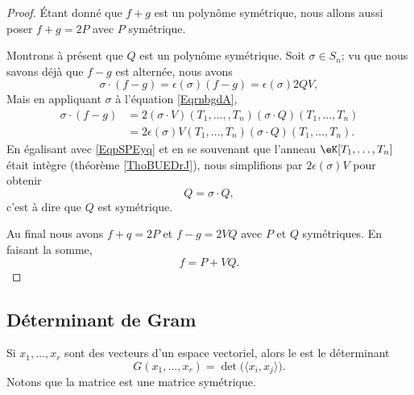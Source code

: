 \begin{proof}
    Étant donné que \( f+g\) est un polynôme symétrique, nous allons aussi poser \( f+g=2P\) avec \( P\) symétrique.

    Montrons à présent que \( Q\) est un polynôme symétrique. Soit \( \sigma\in S_n\); vu que nous savons déjà que \( f-g\) est alternée, nous avons
    \begin{equation}    \label{EqpSPEyq}
        \sigma\cdot (f-g)=\epsilon(\sigma)(f-g)=\epsilon(\sigma)2QV,
    \end{equation}
    Mais en appliquant \( \sigma\) à l'équation \eqref{EqrnbgdA},
    \begin{subequations}
        \begin{align}
            \sigma\cdot (f-g)&=2(\sigma\cdot V)(T_1,\ldots, ,T_n)(\sigma\cdot Q)(T_1,\ldots,T_n)\\
            &=2\epsilon(\sigma)V(T_1,\ldots, T_n)(\sigma\cdot Q)(T_1,\ldots, T_n).
        \end{align}
    \end{subequations}
    En égalisant avec \eqref{EqpSPEyq} et en se souvenant que l'anneau \( \eK[T_1,\ldots, T_n]\) était intègre (théorème \ref{ThoBUEDrJ}), nous simplifions par \( 2\epsilon(\sigma)V\) pour obtenir
    \begin{equation}
        Q=\sigma\cdot Q,
    \end{equation}
    c'est à dire que \( Q\) est symétrique.

    Au final nous avons \( f+q=2P\) et \( f-g=2VQ\) avec \( P\) et \( Q\) symétriques. En faisant la somme,
    \begin{equation}
        f=P+VQ.
    \end{equation}
\end{proof}

\subsection{Déterminant de Gram}

Si \( x_1,\ldots, x_r\) sont des vecteurs d'un espace vectoriel, alors le  est le déterminant
\begin{equation}
    G(x_1,\ldots, x_r)=\det\big( \langle x_i, x_j\rangle  \big).
\end{equation}
Notons que la matrice est une matrice symétrique.

